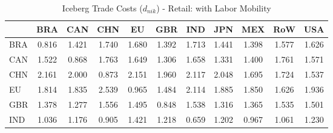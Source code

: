 \begin{table}[htbp]
\centering
\caption{Iceberg Trade Costs ($d_{nik}$) - Retail: with Labor Mobility} 
\label{tab:iceberg_Retail}
\begin{tabular}{lcccccccccc}
  \hline
 & BRA & CAN & CHN & EU & GBR & IND & JPN & MEX & RoW & USA \\ 
  \hline
BRA & \textcolor[RGB]{247,160,8}{0.816} & \textcolor[RGB]{163,106,92}{1.421} & \textcolor[RGB]{54,35,201}{1.740} & \textcolor[RGB]{69,45,186}{1.680} & \textcolor[RGB]{186,120,69}{1.392} & \textcolor[RGB]{61,40,194}{1.713} & \textcolor[RGB]{156,101,99}{1.441} & \textcolor[RGB]{184,119,71}{1.398} & \textcolor[RGB]{105,68,150}{1.577} & \textcolor[RGB]{89,58,166}{1.626} \\ 
  CAN & \textcolor[RGB]{125,81,130}{1.522} & \textcolor[RGB]{237,153,18}{0.868} & \textcolor[RGB]{48,31,207}{1.763} & \textcolor[RGB]{79,51,176}{1.649} & \textcolor[RGB]{201,130,54}{1.306} & \textcolor[RGB]{74,48,181}{1.658} & \textcolor[RGB]{196,127,59}{1.331} & \textcolor[RGB]{181,117,74}{1.400} & \textcolor[RGB]{51,33,204}{1.761} & \textcolor[RGB]{107,69,148}{1.571} \\ 
  CHN & \textcolor[RGB]{3,2,252}{2.161} & \textcolor[RGB]{18,12,237}{2.000} & \textcolor[RGB]{235,152,20}{0.873} & \textcolor[RGB]{5,3,250}{2.151} & \textcolor[RGB]{23,15,232}{1.960} & \textcolor[RGB]{10,7,245}{2.117} & \textcolor[RGB]{15,10,240}{2.048} & \textcolor[RGB]{66,43,189}{1.695} & \textcolor[RGB]{56,36,199}{1.724} & \textcolor[RGB]{117,76,138}{1.537} \\ 
  EU & \textcolor[RGB]{43,28,212}{1.814} & \textcolor[RGB]{38,25,217}{1.835} & \textcolor[RGB]{0,0,255}{2.539} & \textcolor[RGB]{227,147,28}{0.965} & \textcolor[RGB]{140,91,115}{1.484} & \textcolor[RGB]{13,8,242}{2.114} & \textcolor[RGB]{28,18,227}{1.885} & \textcolor[RGB]{36,23,219}{1.850} & \textcolor[RGB]{87,56,168}{1.626} & \textcolor[RGB]{25,16,230}{1.936} \\ 
  GBR & \textcolor[RGB]{189,122,66}{1.378} & \textcolor[RGB]{204,132,51}{1.277} & \textcolor[RGB]{112,73,143}{1.556} & \textcolor[RGB]{138,89,117}{1.495} & \textcolor[RGB]{242,157,13}{0.848} & \textcolor[RGB]{115,74,140}{1.538} & \textcolor[RGB]{199,129,56}{1.316} & \textcolor[RGB]{194,125,61}{1.365} & \textcolor[RGB]{120,78,135}{1.535} & \textcolor[RGB]{133,86,122}{1.501} \\ 
  IND & \textcolor[RGB]{222,144,33}{1.036} & \textcolor[RGB]{217,140,38}{1.176} & \textcolor[RGB]{232,150,23}{0.905} & \textcolor[RGB]{161,104,94}{1.421} & \textcolor[RGB]{212,137,43}{1.218} & \textcolor[RGB]{252,163,3}{0.659} & \textcolor[RGB]{214,139,41}{1.202} & \textcolor[RGB]{224,145,31}{0.967} & \textcolor[RGB]{219,142,36}{1.061} & \textcolor[RGB]{209,135,46}{1.230} \\ 

\end{tabular}
\end{table}
